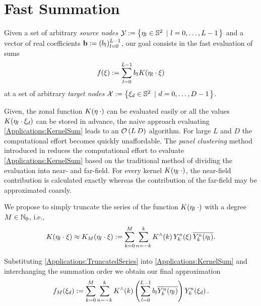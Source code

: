 \documentclass[11pt,a4paper,twoside,bibtotoc]{scrartcl}
\theoremstyle{plain}
\theoremstyle{definition}
\theoremstyle{remark}
\numberwithin{equation}{section}
\numberwithin{table}{section}
\numberwithin{figure}{section}
\begin{document}
\section{Fast Summation}
Given a set of arbitrary \emph{source nodes} $\mathcal{Y} :=
  \left\{\mathbf{\eta}_{l} \in \mathbb{S}^2\ \left|\ l = 0,\ldots,L-1\right.\right\rbrace$ and a vector of
  real coefficients $\mathbf{b}:=(b_{l})_{l=0}^{L-1}$, our goal consists in the fast
evaluation of sums 
\begin{equation}
  \label{Applications:KernelSum}
  f{\hspace{-0.4ex}}\left(\xi\right) := \sum_{l = 0}^{L-1} b_{l} K{\hspace{-0.4ex}}\left(\mathbf{\eta}_{l} \cdot \mathbf{\xi}\right)
\end{equation}
at a set of arbitrary \emph{target nodes} $\mathcal{X} := \left\{\mathbf{\xi}_{d}
  \in \mathbb{S}^2\ \left|\ d=0,\ldots,D-1\right.\right\rbrace$.

Given, the zonal function $K{\hspace{-0.4ex}}\left(\mathbf{\eta} \: \cdot\right)$ can be evaluated easily
or all the values $K{\hspace{-0.4ex}}\left(\mathbf{\eta}_{l} \cdot \mathbf{\xi}_{d}\right)$ can be stored in
advance, the naive approach evaluating \eqref{Applications:KernelSum} leads to
an $\mathcal{O}\left(L\:D\right)$ algorithm. 
For large $L$ and $D$ the computational effort becomes quickly unaffordable.
The \emph{panel clustering} method introduced in \cite{FrGlSch98} reduces the
computational effort to evaluate \eqref{Applications:KernelSum} based on the
traditional method of dividing the evaluation into near- and far-field.
For every kernel $K{\hspace{-0.4ex}}\left(\mathbf{\eta}_l \: \cdot\right)$, the near-field contribution
is calculated exactly whereas the contribution of the far-field may be
approximated coarsly.

We propose to simply truncate the series of the function
$K{\hspace{-0.4ex}}\left(\mathbf{\eta}_{l}\: \cdot\right)$ with a degree $M \in \mathbb{N}_{0}$, i.e.,
\begin{equation}
  \label{Applications:TruncatedSeries}
  K{\hspace{-0.4ex}}\left(\mathbf{\eta}_{l} \cdot \mathbf{\xi}\right) \approx K_{M}{\hspace{-0.4ex}}\left(\mathbf{\eta}_{l} \cdot
  \mathbf{\xi}\right) := \sum_{k=0}^{M} \sum_{n=-k}^k K^{\wedge}{\hspace{-0.4ex}}\left(k\right)
  Y_{k}^n{\hspace{-0.4ex}}\left(\mathbf{\xi}\right) \overline{Y_{k}^n{\hspace{-0.4ex}}\left(\mathbf{\eta}_{l}\right)}.
\end{equation}

Substituting \eqref{Applications:TruncatedSeries} into
\eqref{Applications:KernelSum} and interchanging the summation order we obtain
our final approximation
\[
  f_{M}{\hspace{-0.4ex}}\left(\xi_{d}\right) := \sum_{k=0}^{M} \sum_{n=-k}^k K^{\wedge}{\hspace{-0.4ex}}\left(k\right)
  \left(\sum_{l = 0}^{L-1} b_{l} \overline{Y_{k}^n{\hspace{-0.4ex}}\left(\mathbf{\eta}_{l}\right)}\right)
  Y_{k}^n{\hspace{-0.4ex}}\left(\mathbf{\xi}_{d}\right).
\]
\end{document}
